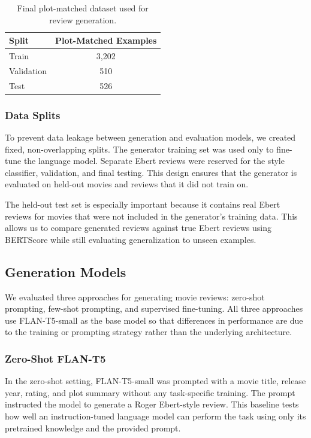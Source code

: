 \begin{table}[h]
\centering
\begin{tabular}{l c}
\hline
\textbf{Split} & \textbf{Plot-Matched Examples} \\
\hline
Train & 3,202 \\
Validation & 510 \\
Test & 526 \\
\hline
\end{tabular}
\caption{Final plot-matched dataset used for review generation.}
\label{tab:data}
\end{table}

\subsubsection{Data Splits}

To prevent data leakage between generation and evaluation models, we created fixed, non-overlapping splits. The generator training set was used only to fine-tune the language model. Separate Ebert reviews were reserved for the style classifier, validation, and final testing. This design ensures that the generator is evaluated on held-out movies and reviews that it did not train on.

The held-out test set is especially important because it contains real Ebert reviews for movies that were not included in the generator's training data. This allows us to compare generated reviews against true Ebert reviews using BERTScore while still evaluating generalization to unseen examples.

\subsection{Generation Models}

We evaluated three approaches for generating movie reviews: zero-shot prompting, few-shot prompting, and supervised fine-tuning. All three approaches use FLAN-T5-small as the base model so that differences in performance are due to the training or prompting strategy rather than the underlying architecture.

\subsubsection{Zero-Shot FLAN-T5}

In the zero-shot setting, FLAN-T5-small was prompted with a movie title, release year, rating, and plot summary without any task-specific training. The prompt instructed the model to generate a Roger Ebert-style review. This baseline tests how well an instruction-tuned language model can perform the task using only its pretrained knowledge and the provided prompt.

